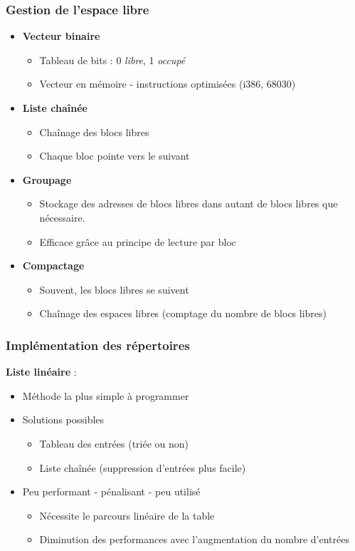 \begin{frame}
\frametitle{Gestion de l'espace libre}
\begin{itemize}
\item \textbf{Vecteur binaire}
\begin{itemize}
\item Tableau de bits : 0 \textit{libre}, 1 \textit{occupé}
\item Vecteur en mémoire - instructions optimisées (i386, 68030)
\end{itemize}
\item \textbf{Liste chaînée}
\begin{itemize}
\item Chaînage des blocs libres
\item Chaque bloc pointe vers le suivant
\end{itemize}
\item \textbf{Groupage}
\begin{itemize}
\item Stockage des adresses de blocs libres dans autant de blocs libres que nécessaire.
\item Efficace grâce au principe de lecture par bloc
\end{itemize}
\item \textbf{Compactage}
\begin{itemize}
\item Souvent, les blocs libres se suivent
\item Chaînage des espaces libres (comptage du nombre de blocs libres)
\end{itemize}
\end{itemize}
\end{frame}

\begin{frame}
\frametitle{Implémentation des répertoires}
\textbf{Liste linéaire} :
\begin{itemize}
\item Méthode la plus simple à programmer
\item Solutions possibles 
\begin{itemize}
\item Tableau des entrées (triée ou non)
\item Liste chaînée (suppression d'entrées plus facile)
\end{itemize}
\item Peu performant - pénalisant - peu utilisé
\begin{itemize}
\item Nécessite le parcours linéaire de la table
\item Diminution des performances avec l'augmentation du nombre d'entrées
\end{itemize}
\end{itemize}
\end{frame}


